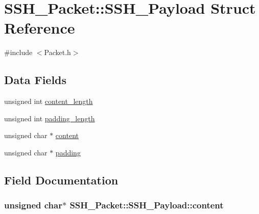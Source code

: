 \hypertarget{structSSH__Packet_1_1SSH__Payload}{}\section{S\+S\+H\+\_\+\+Packet\+:\+:S\+S\+H\+\_\+\+Payload Struct Reference}
\label{structSSH__Packet_1_1SSH__Payload}


{\ttfamily \#include $<$Packet.\+h$>$}

\subsection*{Data Fields}
\begin{DoxyCompactItemize}
\item 
unsigned int \hyperlink{structSSH__Packet_1_1SSH__Payload_ac9ee8ecb0b1c010959ffdd83ad36f5d4}{content\+\_\+length}
\item 
unsigned int \hyperlink{structSSH__Packet_1_1SSH__Payload_a51efea1b4439c6e97e13d583406b3b88}{padding\+\_\+length}
\item 
unsigned char $\ast$ \hyperlink{structSSH__Packet_1_1SSH__Payload_a1032f8d26567fabcf8a4dc11d113523b}{content}
\item 
unsigned char $\ast$ \hyperlink{structSSH__Packet_1_1SSH__Payload_a15717400f2e8f8c8c10e955f86b391eb}{padding}
\end{DoxyCompactItemize}


\subsection{Field Documentation}
\subsubsection[{\texorpdfstring{content}{content}}]{\setlength{\rightskip}{0pt plus 5cm}unsigned char$\ast$ S\+S\+H\+\_\+\+Packet\+::\+S\+S\+H\+\_\+\+Payload\+::content}\hypertarget{structSSH__Packet_1_1SSH__Payload_a1032f8d26567fabcf8a4dc11d113523b}{}\label{structSSH__Packet_1_1SSH__Payload_a1032f8d26567fabcf8a4dc11d113523b}
